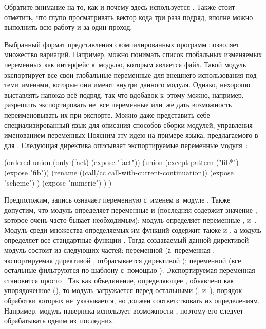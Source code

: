Обратите внимание на то, как и почему здесь используется
. Также стоит отметить, что глупо просматривать вектор
кода три раза подряд, вполне можно выполнить всю работу и за один проход.

Выбранный формат представления скомпилированных программ позволяет множество
вариаций. Например, можно понимать список глобальных изменяемых переменных как
интерфейс к~модулю, которым является файл. Такой модуль экспортирует все свои
глобальные переменные для внешнего использования под теми именами, которые они
имеют внутри данного модуля. Однако, нехорошо выставлять напоказ всё подряд,
так что вдобавок к~этому можно, например, разрешить экспортировать не~все
переменные или~же дать возможность переименовывать их при экспорте. Можно даже
представить себе специализированный язык для описания способов сборки модулей,
управления именованием переменных {\itd} Поясним эту идею на примере языка,
предлагаемого в~\cite{qp91a} для {\EuLisp}. Следующая директива описывает
экспортируемые переменные модуля~:

\begin{code:lisp}
(ordered-union
  (only (fact) (expose "fact"))
  (union (except-pattern ("fib*") (expose "fib"))
         (rename ((call/cc call-with-current-continuation))
           (expose "scheme") )
         (expose "numeric") ) )
\end{code:lisp}

Предположим, запись  означает переменную с~именем  в~модуле
. Также допустим, что модуль  определяет переменные  и
 (последняя содержит значение , которое очень часто
бывает необходимым); модуль  определяет переменные , 
и~. Модуль  среди множества определяемых им функций
содержит также  и , а модуль  определяет все
стандартные функции \RnRS. Тогда создаваемый данной директивой модуль состоит из
следующих частей: переменной  (а~переменная ,
экспортируемая директивой , отбрасывается директивой
); переменной  (все остальные фильтруются по шаблону
с~помощью ). Экспортируемая переменная
 становится просто
. Так как объединение, определяющее , объявлено
как упорядоченное (), то модуль  загружается
перед остальными (,  и~), порядок обработки
которых не~указывается, но должен соответствовать их определениям. Например,
модуль  наверняка использует возможности , поэтому его
следует обрабатывать одним из~последних.


